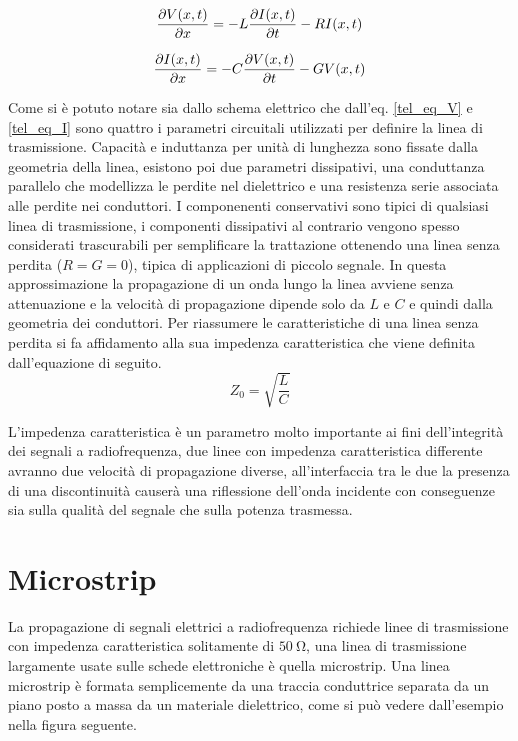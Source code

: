 \documentclass[12pt,oneside]{book}
\begin{document}
\begin{equation}
    \pdv{V(x,t)}{x}=-L\pdv{I(x,t)}{t}-RI(x,t)
    \label{tel_eq_V}
\end{equation} 

\begin{equation}
    \pdv{I(x,t)}{x}=-C\pdv{V(x,t)}{t}-GV(x,t)
    \label{tel_eq_I}
\end{equation} 





Come si è potuto notare sia dallo schema elettrico che dall'eq. \eqref{tel_eq_V} e \eqref{tel_eq_I} sono quattro i parametri circuitali utilizzati per definire la linea di trasmissione. Capacità e induttanza per unità di lunghezza sono fissate dalla geometria della linea, esistono poi due parametri dissipativi, una conduttanza parallelo che modellizza le perdite nel dielettrico e una resistenza serie associata alle perdite nei conduttori. I componenenti conservativi sono tipici di qualsiasi linea di trasmissione, i componenti dissipativi al contrario vengono spesso considerati trascurabili per semplificare la trattazione ottenendo una linea senza perdita ($R=G=0$), tipica di applicazioni di piccolo segnale. In questa approssimazione la propagazione di un onda lungo la linea avviene senza attenuazione e la velocità di propagazione dipende solo da $L$ e $C$ e quindi dalla geometria dei conduttori. Per riassumere le caratteristiche di una linea senza perdita si fa affidamento alla sua impedenza caratteristica che viene definita dall'equazione di seguito.
\begin{equation}
    Z_0=\sqrt{\dfrac{L}{C}}
\end{equation}

L'impedenza caratteristica è un parametro molto importante ai fini dell'integrità dei segnali a radiofrequenza, due linee con impedenza caratteristica differente avranno due velocità di propagazione diverse, all'interfaccia tra le due la presenza di una discontinuità causerà una riflessione dell'onda incidente con conseguenze sia sulla qualità del segnale che sulla potenza trasmessa.

\section{Microstrip}
La propagazione di segnali elettrici a radiofrequenza richiede linee di trasmissione con impedenza caratteristica solitamente di $\SI{50}{\ohm}$, una linea di trasmissione largamente usate sulle schede elettroniche è quella microstrip. Una linea microstrip è formata semplicemente da una traccia conduttrice separata da un piano posto a massa da un materiale dielettrico, come si può vedere dall'esempio nella figura seguente.
\end{document}
